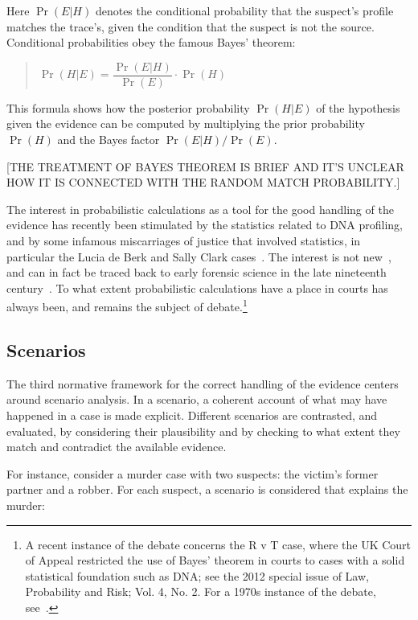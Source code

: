 \documentclass[10pt]{article}
\begin{document}
\noindent Here $\Pr(E|H)$ denotes the conditional probability that the suspect's profile matches the trace's, given the condition that the suspect is not the source. Conditional probabilities obey the famous Bayes' theorem:

\begin{quotation}
	$\Pr(H|E) = \dfrac{\Pr(E|H)}{\Pr(E)}\cdot\Pr(H)$
\end{quotation}

\noindent This formula shows how the posterior probability $\Pr(H|E)$ of the hypothesis given the evidence can be computed by multiplying the prior probability $\Pr(H)$ and the Bayes factor $\Pr(E|H)/\Pr(E)$.

[THE TREATMENT OF BAYES THEOREM IS BRIEF AND IT'S 
UNCLEAR HOW IT IS CONNECTED WITH THE RANDOM MATCH PROBABILITY.]

The interest in probabilistic calculations as a tool for the good handling of the evidence has recently been stimulated by the statistics related to DNA profiling, and by some infamous miscarriages of justice that involved statistics, in particular the Lucia de Berk and Sally Clark cases~\citep{dawidEtal2011,fenton2011,schnepsColmez2013}. The interest is not new~\citep{tillers2011}, and can in fact be traced back to early forensic science in the late nineteenth century~\citep{taroniEtal1998}. To what extent probabilistic calculations have a place in courts has always been, and remains the subject of debate.\footnote{A recent instance of the debate concerns the R v T case, where the UK Court of Appeal restricted the use of Bayes' theorem in courts to cases with a solid statistical foundation such as DNA; see the 2012 special issue of Law, Probability and Risk; Vol. 4, No. 2. For a 1970s instance of the debate, see~\citet{finkelsteinFairley1970,tribe1971}.}

\subsection{Scenarios}
\label{sec:introScen}
The third normative framework for the correct handling of the evidence centers around scenario analysis. In a scenario, a coherent account of what may have happened in a case is made explicit. Different scenarios are contrasted, and evaluated, by considering their plausibility and by checking to what extent they match and contradict the available evidence. 

For instance, consider a murder case with two suspects: the victim's former partner and a robber. For each suspect, a scenario is considered that explains the murder:
\end{document}
